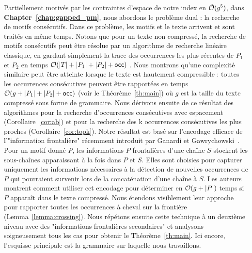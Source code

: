 Partiellement motivés par les contraintes d'espace de notre index en $\tilde {\mathcal{O}}(g^5)$, dans \textbf{Chapter~\ref{chap:gapped_pm}}, nous abordons le problème dual : la recherche de motifs consécutifs.  Dans ce problème, les motifs et le texte arrivent et sont traités en même temps. Notons que pour un texte non compressé, la recherche de motifs consécutifs peut être résolue par un algorithme de recherche linéaire classique, en gardant simplement la trace des occurrences les plus récentes de $P_1$ et $P_2$ en temps $\mathcal{O}(|T|+|P_1|+|P_2|+\mathsf{occ})$ .
Nous montrons qu'une complexité similaire peut être atteinte lorsque le texte est hautement compressible : toutes les occurrences consécutives peuvent être rapportées en temps $\mathcal{O}(g+|P_1|+|P_2|+\mathsf{occ})$  (voir le Théorème~\ref{th:main}) où $g$ est la taille du texte compressé sous forme de grammaire. Nous dérivons ensuite de ce résultat des algorithmes pour la recherche d'occurrences consécutives avec espacement (Corollaire~\ref{cor:ab}) et pour la recherche des k occurrences consécutives les plus proches (Corollaire~\ref{cor:topk}).
%
Notre résultat est basé sur l'encodage efficace de l'"information frontalière" récemment introduit par Ganardi et Gawrychowski~\cite{DBLP:conf/soda/GanardiG22}. Pour un motif donné $P$, les informations  $P$-frontalières d'une chaîne $S$ stockent les sous-chaînes apparaissant à la fois dans $P$ et $S$. Elles sont choisies pour capturer uniquement les informations nécessaires à la détection de nouvelles occurrences de $P$ qui pourraient survenir lors de la concaténation d'une chaîne à $S$. 
%
Les auteurs montrent comment utiliser cet encodage pour déterminer en $\mathcal{O}(g+|P|)$ temps si $P$ apparaît dans le texte compressé. Nous étendons visiblement leur approche pour rapporter toutes les occurrences à cheval sur  la frontière (Lemma~\ref{lemma:crossing}). Nous répétons ensuite cette technique à un deuxième niveau avec des "informations frontalières secondaires" et analysons soigneusement tous les cas pour obtenir le Théorème~\ref{th:main}. Ici encore, l'esquisse principale est la grammaire sur laquelle nous travaillons.\\


